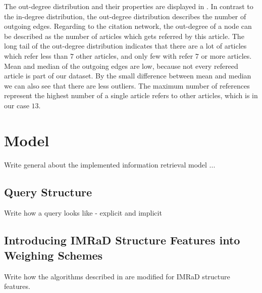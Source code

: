 The out-degree distribution and their properties are displayed in . In contrast to the in-degree distribution, the out-degree distribution describes the number of outgoing edges. Regarding to the citation network, the out-degree of a node can be described as the number of articles which gets referred by this article. The long tail of the out-degree distribution indicates that there are a lot of articles which refer less than $7$ other articles, and only few with refer $7$ or more articles. Mean and median of the outgoing edges are low, because not every refereed article is part of our dataset. By the small difference between mean and median we can also see that there are less outliers. The maximum number of references represent the highest number of a single article refers to other articles, which is in our case $13$.

\section{Model}
\label{sec:model}

Write general about the implemented information retrieval model ...

\subsection{Query Structure}

Write how a query looks like - explicit and implicit

\subsection{Introducing IMRaD Structure Features into Weighing Schemes}

Write how the algorithms described in  are modified for IMRaD structure features.
